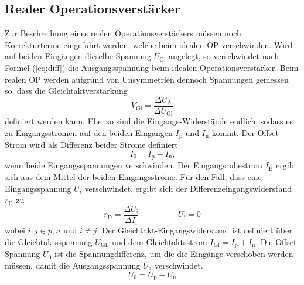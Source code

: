 \subsection{Realer Operationsverstärker}%
\label{sub:realer_operationsverstaerker}

Zur Beschreibung eines realen Operationsverstärkers müssen noch Korrekturterme
eingeführt werden, welche beim idealen OP verschwinden.
Wird auf beiden Eingängen dieselbe Spannung $U_\text{Gl}$ angelegt, so
verschwindet nach Formel (\ref{eq:diff}) die Ausgangsspannung beim idealen
Operationsverstärker.
Beim realen OP werden aufgrund von Unsymmetrien dennoch Spannungen gemessen so, dass
die Gleichtaktverstärkung
\begin{equation}
		V_\text{Gl} = \frac{\Delta U_\text{A}}{\Delta U_\text{Gl}}
\end{equation}
definiert werden kann.
Ebenso sind die Eingangs-Widerstände endlich, sodass es zu Eingangsströmen auf
den beiden Eingängen $I_\text{p}$ und $I_\text{n}$ kommt.
Der Offset-Strom wird als Differenz beider Ströme definiert
\begin{equation}
  I_0 = I_\text{p} - I_\text{n}\text{,}
\end{equation}
wenn beide Eingangsspannungen verschwinden.
Der Eingangsruhestrom $I_\text{B}$ ergibt sich aus dem Mittel der beiden Eingangsströme.
Für den Fall, dass eine Eingangsspannung $U_{i}$ verschwindet, ergibt sich der
Differenzeingangswiderstand $r_\text{D}$ zu
\begin{equation}
		r_\text{D} = \frac{\Delta U_\text{i}}{\Delta I_\text{i}} \hspace{2cm} U_\text{j} = 0
\end{equation}
wobei $i,j \in p,n$ und $i \neq j$.
Der Gleichtakt-Eingangswiderstand ist definiert über die Gleichtaktsspannung
$U_\text{GL}$ und dem Gleichtaktsstrom $I_\text{Gl} = I_\text{p} + I_\text{n}$.
Die Offset-Spannung $U_0$ ist die Spannungdifferenz, um die die Eingänge
verschoben werden müssen, damit die Ausgangsspannung $U_\text{a}$ verschwindet.
\begin{equation}
		U_0 = U_\text{p} - U_\text{n}
\end{equation}

